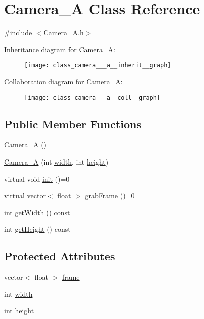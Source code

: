 \hypertarget{class_camera___a}{\section{Camera\-\_\-\-A Class Reference}
\label{class_camera___a}
}


{\ttfamily \#include $<$Camera\-\_\-\-A.\-h$>$}



Inheritance diagram for Camera\-\_\-\-A\-:\nopagebreak
\begin{figure}[H]
\begin{center}
\leavevmode
\texttt{[image: class\_camera\_\_\_a\_\_inherit\_\_graph]}
\end{center}
\end{figure}


Collaboration diagram for Camera\-\_\-\-A\-:\nopagebreak
\begin{figure}[H]
\begin{center}
\leavevmode
\texttt{[image: class\_camera\_\_\_a\_\_coll\_\_graph]}
\end{center}
\end{figure}
\subsection*{Public Member Functions}
\begin{DoxyCompactItemize}
\item 
\hyperlink{class_camera___a_a5204e28a95f0cd2d8aa17387f34d3fea}{Camera\-\_\-\-A} ()
\item 
\hyperlink{class_camera___a_affa6bad32fb358538d87b42e131789a3}{Camera\-\_\-\-A} (int \hyperlink{class_camera___a_abe6c7a2c84c368e8e8dd366444490953}{width}, int \hyperlink{class_camera___a_af2d2b7eedefafea58af3467325f4214e}{height})
\item 
virtual void \hyperlink{class_camera___a_a9545b869b944da4a9baa528b8a1fef8e}{init} ()=0
\item 
virtual vector$<$ float $>$ \hyperlink{class_camera___a_afebeedc438219ef7590e2e0b6c140c42}{grab\-Frame} ()=0
\item 
int \hyperlink{class_camera___a_a4f71c1a128299b587696f996714e0002}{get\-Width} () const 
\item 
int \hyperlink{class_camera___a_afe39759777fa2722e0a013ad5af0fe8e}{get\-Height} () const 
\end{DoxyCompactItemize}
\subsection*{Protected Attributes}
\begin{DoxyCompactItemize}
\item 
vector$<$ float $>$ \hyperlink{class_camera___a_a062e331c0b3bc525ba2f2724008d3d20}{frame}
\item 
int \hyperlink{class_camera___a_abe6c7a2c84c368e8e8dd366444490953}{width}
\item 
int \hyperlink{class_camera___a_af2d2b7eedefafea58af3467325f4214e}{height}
\end{DoxyCompactItemize}


